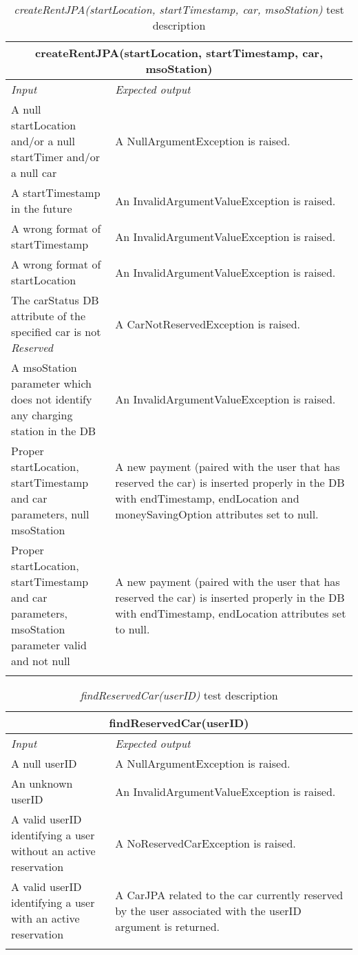 \begin{longtable}{p{0.3\linewidth}p{0.7\linewidth}}
\multicolumn{2}{c}{\textbf{createRentJPA(startLocation, startTimestamp, car, msoStation)}} \\
\toprule
\emph{Input} & \emph{Expected output} \\
\midrule
A null startLocation and/or a null startTimer and/or a null car & A NullArgumentException is raised.\\
\midrule
A startTimestamp in the future & An InvalidArgumentValueException is raised. \\
\midrule
A wrong format of startTimestamp & An InvalidArgumentValueException is raised. \\
\midrule
A wrong format of startLocation & An InvalidArgumentValueException is raised. \\
\midrule
The carStatus DB attribute of the specified car is not \emph{Reserved} & A CarNotReservedException is raised. \\
\midrule
A msoStation parameter which does not identify any charging station in the DB & An InvalidArgumentValueException is raised. \\
\midrule
Proper startLocation, startTimestamp and car parameters, null msoStation & A new payment (paired with the user that has reserved the car) is inserted properly in the DB with endTimestamp, endLocation and moneySavingOption attributes set to null.\\
\midrule
Proper \mbox{startLocation}, startTimestamp and car parameters, \mbox{msoStation} parameter valid and not null & A new payment (paired with the user that has reserved the car) is inserted properly in the DB with endTimestamp, endLocation attributes set to null.\\
\bottomrule
\caption{\emph{createRentJPA(startLocation, startTimestamp, car, msoStation)} test description}
\end{longtable}

\begin{longtable}{p{0.3\linewidth}p{0.7\linewidth}}
\multicolumn{2}{c}{\textbf{findReservedCar(userID)}} \\
\toprule
\emph{Input} & \emph{Expected output} \\
\midrule
A null userID & A NullArgumentException is raised.\\
\midrule
An unknown userID  & An InvalidArgumentValueException is raised. \\
\midrule
A valid userID identifying a user without an active reservation & A NoReservedCarException is raised. \\
\midrule
A valid userID identifying a user with an active reservation & A CarJPA related to the car currently reserved by the user associated with the userID argument is returned.\\
\bottomrule
\caption{\emph{findReservedCar(userID)} test description}
\end{longtable}

